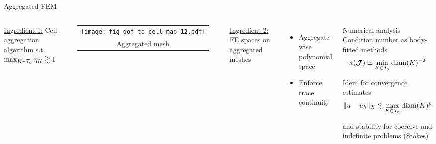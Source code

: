 \begin{frame}{Aggregated FEM}
  \begin{columns}[onlytextwidth]


    \underline{Ingredient 1:} Cell aggregation algorithm s.t.
 $\max_{K \in \mathcal{T}_\alpha} {\eta_K} \gtrsim 1$

 \vspace{0.5cm}

 \begin{tabular}{c}
    \texttt{[image: fig\_dof\_to\_cell\_map\_12.pdf]} \\
    {\footnotesize Aggregated mesh}
    \end{tabular}

    \vspace{0.2cm}
    \underline{Ingredient 2:} FE spaces on aggregated meshes
    \begin{itemize}
      \item Aggregate-wise polynomial space
      \item Enforce trace continuity
    \end{itemize}




    \begin{block}{Numerical analysis}
      Condition number as body-fitted methods
      $$\kappa(\boldsymbol{\mathcal{J}}) \simeq  \min_{K \in \mathcal{T}_\alpha} {\rm diam}(K)^{-2}$$

      Idem for convergence estimates
    $$
    \| u - u_h \|_{X} \lesssim \max_{K \in \mathcal{T}_\alpha} {\rm diam}(K)^{p}$$

    and stability for coercive and indefinite problems (Stokes)%
        \end{block}

  \end{columns}
\end{frame}

